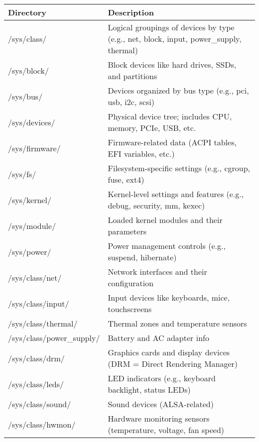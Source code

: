 \begin{NxLightBox}[title=Pseudo Virtual Filesystems]
	\begin{tabularx}{\textwidth}{|l|X|}
		\hline
		\textbf{Directory} & \textbf{Description} \\
		\hline
		/sys/class/ & Logical groupings of devices by type (e.g., net, block, input, power\_supply, thermal) \\
		\hline
		/sys/block/ & Block devices like hard drives, SSDs, and partitions \\
		\hline
		/sys/bus/ & Devices organized by bus type (e.g., pci, usb, i2c, scsi) \\
		\hline
		/sys/devices/ & Physical device tree; includes CPU, memory, PCIe, USB, etc. \\
		\hline
		/sys/firmware/ & Firmware-related data (ACPI tables, EFI variables, etc.) \\
		\hline
		/sys/fs/ & Filesystem-specific settings (e.g., cgroup, fuse, ext4) \\
		\hline
		/sys/kernel/ & Kernel-level settings and features (e.g., debug, security, mm, kexec) \\
		\hline
		/sys/module/ & Loaded kernel modules and their parameters \\
		\hline
		/sys/power/ & Power management controls (e.g., suspend, hibernate) \\
		\hline
		/sys/class/net/ & Network interfaces and their configuration \\
		\hline
		/sys/class/input/ & Input devices like keyboards, mice, touchscreens \\
		\hline
		/sys/class/thermal/ & Thermal zones and temperature sensors \\
		\hline
		/sys/class/power\_supply/ & Battery and AC adapter info \\
		\hline
		/sys/class/drm/ & Graphics cards and display devices (DRM = Direct Rendering Manager) \\
		\hline
		/sys/class/leds/ & LED indicators (e.g., keyboard backlight, status LEDs) \\
		\hline
		/sys/class/sound/ & Sound devices (ALSA-related) \\
		\hline
		/sys/class/hwmon/ & Hardware monitoring sensors (temperature, voltage, fan speed) \\
		\hline
	\end{tabularx}
\end{NxLightBox}

